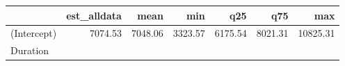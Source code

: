 \documentclass[]{article}
\begin{document}
\begin{longtable}[]{@{}lrrrrrr@{}}
\toprule
\begin{minipage}[b]{0.31\columnwidth}\raggedright\strut
\strut
\end{minipage} & \begin{minipage}[b]{0.10\columnwidth}\raggedleft\strut
est\_alldata\strut
\end{minipage} & \begin{minipage}[b]{0.08\columnwidth}\raggedleft\strut
mean\strut
\end{minipage} & \begin{minipage}[b]{0.08\columnwidth}\raggedleft\strut
min\strut
\end{minipage} & \begin{minipage}[b]{0.08\columnwidth}\raggedleft\strut
q25\strut
\end{minipage} & \begin{minipage}[b]{0.08\columnwidth}\raggedleft\strut
q75\strut
\end{minipage} & \begin{minipage}[b]{0.08\columnwidth}\raggedleft\strut
max\strut
\end{minipage}\tabularnewline
\midrule
\endhead
\begin{minipage}[t]{0.31\columnwidth}\raggedright\strut
(Intercept)\strut
\end{minipage} & \begin{minipage}[t]{0.10\columnwidth}\raggedleft\strut
7074.53\strut
\end{minipage} & \begin{minipage}[t]{0.08\columnwidth}\raggedleft\strut
7048.06\strut
\end{minipage} & \begin{minipage}[t]{0.08\columnwidth}\raggedleft\strut
3323.57\strut
\end{minipage} & \begin{minipage}[t]{0.08\columnwidth}\raggedleft\strut
6175.54\strut
\end{minipage} & \begin{minipage}[t]{0.08\columnwidth}\raggedleft\strut
8021.31\strut
\end{minipage} & \begin{minipage}[t]{0.08\columnwidth}\raggedleft\strut
10825.31\strut
\end{minipage}\tabularnewline
\begin{minipage}[t]{0.31\columnwidth}\raggedright\strut
Duration\strut
\end{minipage} & \begin{minipage}[t]{0.10\columnwidth}\raggedleft\strut

\end{minipage}
\end{longtable}
\end{document}
